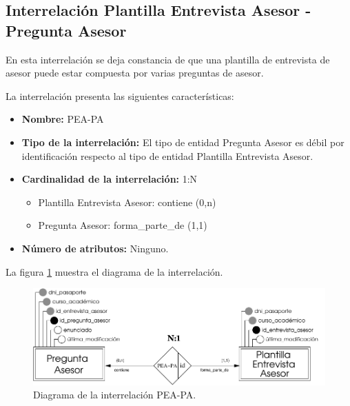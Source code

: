 \subsection{Interrelación Plantilla Entrevista Asesor - Pregunta Asesor}

   \begin{description}
      \item[Definición] En esta interrelación se deja constancia de que una
      plantilla de entrevista de asesor puede estar compuesta por varias
      preguntas de asesor.

      \item[Características] La interrelación presenta las siguientes
                             características:

         \begin{itemize}
            \item \textbf{Nombre:} PEA-PA
            \item \textbf{Tipo de la interrelación:} El tipo de entidad Pregunta
                  Asesor es débil por identificación respecto al tipo de
                  entidad Plantilla Entrevista Asesor.
            \item \textbf{Cardinalidad de la interrelación:} 1:N
                  \begin{itemize}
                     \item Plantilla Entrevista Asesor: contiene (0,n)
                     \item Pregunta Asesor: forma\_parte\_de (1,1)
                  \end{itemize}
            \item \textbf{Número de atributos:} Ninguno.
         \end{itemize}

      \item[Diagrama] La figura \ref{diagramaPEA-PA} muestra el diagrama de la
                      interrelación.

      \item \begin{figure}[!ht]
            \begin{center}
            \includegraphics[]{07.Modelo_Entidad-Interrelacion/7.3.Analisis_Interrelaciones/diagramas/PEA-PA.pdf}
            \caption{Diagrama de la interrelación PEA-PA.}
            \label{diagramaPEA-PA}
            \end{center}
         \end{figure}


\end{description}
